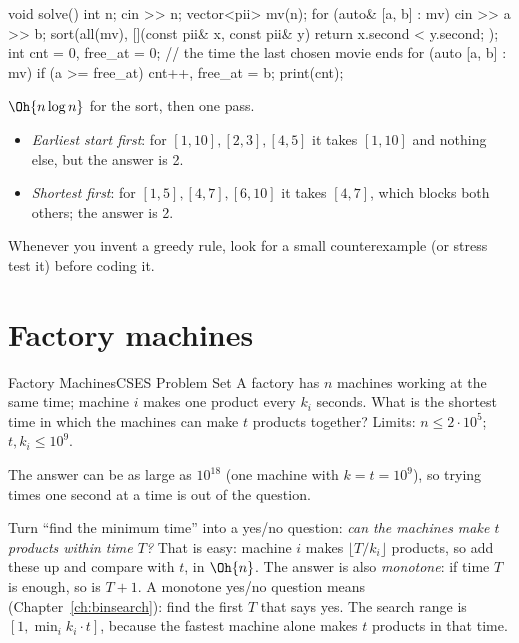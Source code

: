 \begin{code}
void solve() {
    int n;
    cin >> n;
    vector<pii> mv(n);
    for (auto& [a, b] : mv) cin >> a >> b;
    sort(all(mv), [](const pii& x, const pii& y) { return x.second < y.second; });
    int cnt = 0, free_at = 0;  // the time the last chosen movie ends
    for (auto [a, b] : mv)
        if (a >= free_at) cnt++, free_at = b;
    print(cnt);
}
\end{code}

 $\Oh{n\log n}$ for the sort, then one pass.

\begin{pitfall}
\begin{itemize}
  \item \emph{Earliest start first}: for $[1,10], [2,3], [4,5]$ it takes $[1,10]$ and nothing else, but the answer is 2.
  \item \emph{Shortest first}: for $[1,5], [4,7], [6,10]$ it takes $[4,7]$, which blocks both others; the answer is 2.
\end{itemize}
Whenever you invent a greedy rule, look for a small counterexample (or stress test it) before coding it.
\end{pitfall}

\section[Factory machines]{Factory machines \hfill \silver}\label{wp:factory}

\begin{statement}{Factory Machines}{CSES Problem Set}
A factory has $n$ machines working at the same time; machine $i$ makes one product every $k_i$ seconds. What is the
shortest time in which the machines can make $t$ products together? Limits: $n \le 2\cdot 10^5$; $t, k_i \le 10^9$.
\end{statement}

 The answer can be as large as $10^{18}$ (one machine with $k = t = 10^9$), so trying times one
second at a time is out of the question.

 Turn ``find the minimum time'' into a yes/no question: \emph{can the machines make $t$ products within
time $T$?} That is easy: machine $i$ makes $\lfloor T / k_i\rfloor$ products, so add these up and compare with $t$, in
$\Oh{n}$. The answer is also \emph{monotone}: if time $T$ is enough, so is $T+1$. A monotone yes/no question means
 (Chapter~\ref{ch:binsearch}): find the first $T$ that says yes. The search range is
$[1, \min_i k_i \cdot t]$, because the fastest machine alone makes $t$ products in that time.

